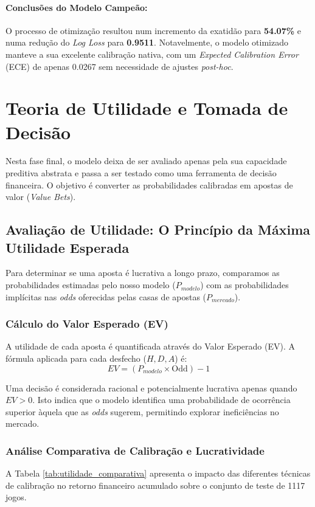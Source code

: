 \documentclass[10pt]{article}
\begin{document}
\paragraph{Conclusões do Modelo Campeão:}
O processo de otimização resultou num incremento da exatidão para \textbf{54.07\%} e numa redução do \textit{Log Loss} para \textbf{0.9511}. Notavelmente, o modelo otimizado manteve a sua excelente calibração nativa, com um \textit{Expected Calibration Error} (ECE) de apenas 0.0267 sem necessidade de ajustes \textit{post-hoc}. 

\section{Teoria de Utilidade e Tomada de Decisão}

Nesta fase final, o modelo deixa de ser avaliado apenas pela sua capacidade preditiva abstrata e passa a ser testado como uma ferramenta de decisão financeira. O objetivo é converter as probabilidades calibradas em apostas de valor (\textit{Value Bets}).

\subsection{Avaliação de Utilidade: O Princípio da Máxima Utilidade Esperada}

Para determinar se uma aposta é lucrativa a longo prazo, comparamos as probabilidades estimadas pelo nosso modelo ($P_{modelo}$) com as probabilidades implícitas nas \textit{odds} oferecidas pelas casas de apostas ($P_{mercado}$). 

\subsubsection{Cálculo do Valor Esperado (EV)}
A utilidade de cada aposta é quantificada através do Valor Esperado (EV). A fórmula aplicada para cada desfecho ($H, D, A$) é:
\begin{equation}
    EV = (P_{modelo} \times \text{Odd}) - 1
\end{equation}

Uma decisão é considerada racional e potencialmente lucrativa apenas quando $EV > 0$. Isto indica que o modelo identifica uma probabilidade de ocorrência superior àquela que as \textit{odds} sugerem, permitindo explorar ineficiências no mercado.

\subsubsection{Análise Comparativa de Calibração e Lucratividade}
A Tabela \ref{tab:utilidade_comparativa} apresenta o impacto das diferentes técnicas de calibração no retorno financeiro acumulado sobre o conjunto de teste de 1117 jogos.
\end{document}
